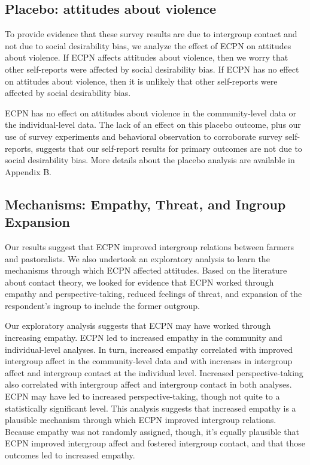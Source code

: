 \documentclass[11pt]{article}
\begin{document}
\hypertarget{placebo-attitudes-about-violence}{%
\subsection{Placebo: attitudes about
violence}\label{placebo-attitudes-about-violence}}

To provide evidence that these survey results are due to intergroup
contact and not due to social desirability bias, we analyze the effect
of ECPN on attitudes about violence. If ECPN affects attitudes about
violence, then we worry that other self-reports were affected by social
desirability bias. If ECPN has no effect on attitudes about violence,
then it is unlikely that other self-reports were affected by social
desirability bias.

ECPN has no effect on attitudes about violence in the community-level
data or the individual-level data. The lack of an effect on this placebo
outcome, plus our use of survey experiments and behavioral observation
to corroborate survey self-reports, suggests that our self-report
results for primary outcomes are not due to social desirability bias.
More details about the placebo analysis are available in Appendix B.

\hypertarget{mechanisms-empathy-threat-and-ingroup-expansion}{%
\subsection{Mechanisms: Empathy, Threat, and Ingroup
Expansion}\label{mechanisms-empathy-threat-and-ingroup-expansion}}

Our results suggest that ECPN improved intergroup relations between
farmers and pastoralists. We also undertook an exploratory analysis to
learn the mechanisms through which ECPN affected attitudes. Based on the
literature about contact theory, we looked for evidence that ECPN worked
through empathy and perspective-taking, reduced feelings of threat, and
expansion of the respondent's ingroup to include the former outgroup.

Our exploratory analysis suggests that ECPN may have worked through
increasing empathy. ECPN led to increased empathy in the community and
individual-level analyses. In turn, increased empathy correlated with
improved intergroup affect in the community-level data and with
increases in intergroup affect and intergroup contact at the individual
level. Increased perspective-taking also correlated with intergroup
affect and intergroup contact in both analyses. ECPN may have led to
increased perspective-taking, though not quite to a statistically
significant level. This analysis suggests that increased empathy is a
plausible mechanism through which ECPN improved intergroup relations.
Because empathy was not randomly assigned, though, it's equally
plausible that ECPN improved intergroup affect and fostered intergroup
contact, and that those outcomes led to increased empathy.
\end{document}
